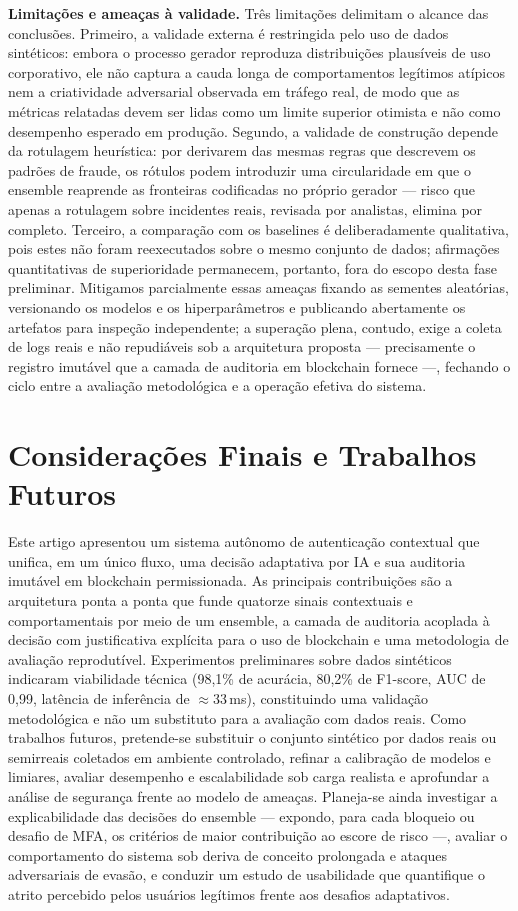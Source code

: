 \documentclass[conference]{IEEEtran}
\begin{document}
\textbf{Limitações e ameaças à validade.} Três limitações delimitam o
alcance das conclusões. Primeiro, a validade externa é restringida pelo
uso de dados sintéticos: embora o processo gerador reproduza
distribuições plausíveis de uso corporativo, ele não captura a cauda
longa de comportamentos legítimos atípicos nem a criatividade
adversarial observada em tráfego real, de modo que as métricas relatadas
devem ser lidas como um limite superior otimista e não como desempenho
esperado em produção. Segundo, a validade de construção depende da
rotulagem heurística: por derivarem das mesmas regras que descrevem os
padrões de fraude, os rótulos podem introduzir uma circularidade em que
o ensemble reaprende as fronteiras codificadas no próprio gerador ---
risco que apenas a rotulagem sobre incidentes reais, revisada por
analistas, elimina por completo. Terceiro, a comparação com os baselines
é deliberadamente qualitativa, pois estes não foram reexecutados sobre o
mesmo conjunto de dados; afirmações quantitativas de superioridade
permanecem, portanto, fora do escopo desta fase preliminar. Mitigamos
parcialmente essas ameaças fixando as sementes aleatórias, versionando os
modelos e os hiperparâmetros e publicando abertamente os artefatos para
inspeção independente; a superação plena, contudo, exige a coleta de logs
reais e não repudiáveis sob a arquitetura proposta --- precisamente o
registro imutável que a camada de auditoria em blockchain fornece ---,
fechando o ciclo entre a avaliação metodológica e a operação efetiva do
sistema.

\section{Considerações Finais e Trabalhos Futuros}
\label{sec:conclusion}
Este artigo apresentou um sistema autônomo de autenticação contextual que
unifica, em um único fluxo, uma decisão adaptativa por IA e sua auditoria
imutável em blockchain permissionada. As principais contribuições são a
arquitetura ponta a ponta que funde quatorze sinais contextuais e
comportamentais por meio de um ensemble, a camada de auditoria acoplada à
decisão com justificativa explícita para o uso de blockchain e uma
metodologia de avaliação reprodutível. Experimentos preliminares sobre
dados sintéticos indicaram viabilidade técnica (98,1\% de acurácia, 80,2\%
de F1-score, AUC de 0,99, latência de inferência de $\approx$33\,ms),
constituindo uma validação metodológica e não um substituto para a
avaliação com dados reais. Como trabalhos futuros, pretende-se substituir
o conjunto sintético por dados reais ou semirreais coletados em ambiente
controlado, refinar a calibração de modelos e limiares, avaliar
desempenho e escalabilidade sob carga realista e aprofundar a análise de
segurança frente ao modelo de ameaças. Planeja-se ainda investigar a
explicabilidade das decisões do ensemble --- expondo, para cada bloqueio
ou desafio de MFA, os critérios de maior contribuição ao escore de
risco ---, avaliar o comportamento do sistema sob deriva de conceito
prolongada e ataques adversariais de evasão, e conduzir um estudo de
usabilidade que quantifique o atrito percebido pelos usuários legítimos
frente aos desafios adaptativos.
\end{document}
